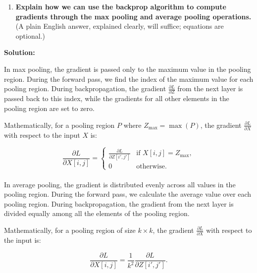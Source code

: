 \documentclass{article}
\newenvironment{solution}{\color{blue} \smallskip \textbf{Solution:}}{}
\begin{document}
\begin{enumerate}
\begin{enumerate}
\begin{solution}
\[
\frac{\partial L}{\partial X[x, y, c]} = \sum_{f} \sum_{i, j} \frac{\partial L}{\partial Z[f, i, j]} \cdot W[f, c, x-i, y-j]
\]

\end{solution}


    \end{enumerate}
    Include your derivations in your writeup.
    
    \item 
    \textbf{Explain how we can use the backprop algorithm to compute gradients through the max pooling and average pooling operations.} 
    (A plain English answer, explained clearly, will suffice; equations are optional.) 
\end{enumerate}

\begin{solution}

In max pooling, the gradient is passed only to the maximum value in the pooling region. During the forward pass, we find the index of the maximum value for each pooling region. During backpropagation, the gradient \( \frac{\partial L}{\partial Z} \) from the next layer is passed back to this index, while the gradients for all other elements in the pooling region are set to zero.

Mathematically, for a pooling region \( P \) where \( Z_{\text{max}} = \max(P) \), the gradient \( \frac{\partial L}{\partial X} \) with respect to the input \( X \) is:

\[
\frac{\partial L}{\partial X[i, j]} =
\begin{cases}
\frac{\partial L}{\partial Z[i', j']} & \text{if } X[i, j] = Z_{\text{max}}, \\
0 & \text{otherwise}.
\end{cases}
\]\\


In average pooling, the gradient is distributed evenly across all values in the pooling region. During the forward pass, we calculate the average value over each pooling region. During backpropagation, the gradient from the next layer is divided equally among all the elements of the pooling region.

Mathematically, for a pooling region of size \( k \times k \), the gradient \( \frac{\partial L}{\partial X} \) with respect to the input is:

\[
\frac{\partial L}{\partial X[i, j]} = \frac{1}{k^2} \frac{\partial L}{\partial Z[i', j']}.
\]


\end{solution}
\end{document}
